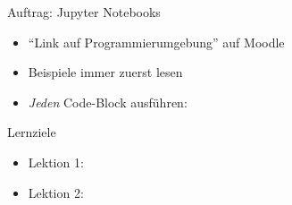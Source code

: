 \begin{frame}{Auftrag: Jupyter Notebooks}
    \begin{itemize}[<+->]
        \item[\faLink{}] \enquote{Link auf Programmierumgebung} auf Moodle
        \item[\faBook{}] Beispiele immer zuerst lesen
        \item[\faPlay{}] \textit{Jeden} Code-Block ausführen: \keys{\shift  + \return}
    \end{itemize}
\end{frame}



\begin{frame}[fragile]{Lernziele}
    \begin{itemize}[<+->]
        \item Lektion 1:
              \lernzielePtOne{\faCheckSquare}
        \item Lektion 2:
              \lernzielePtTwo{\faCheckSquare}
    \end{itemize}
\end{frame}